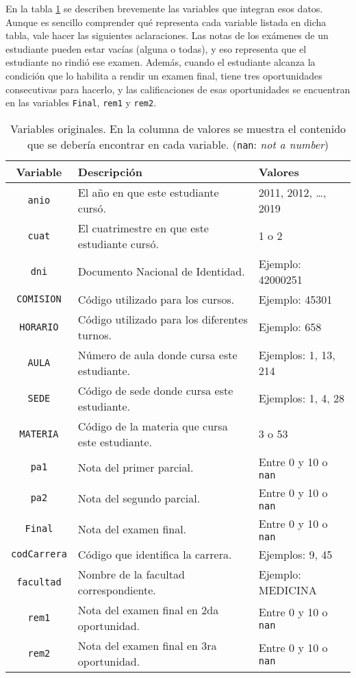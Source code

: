 \documentclass[a4paper,11pt,dvipsnames]{article}
\begin{document}
En la tabla \ref{tab:originales} se describen brevemente las variables que integran esos datos. Aunque es sencillo comprender qué representa cada variable listada en dicha tabla, vale hacer las siguientes aclaraciones. Las notas de los exámenes de un estudiante pueden estar vacías (alguna o todas), y eso representa que el estudiante no rindió ese examen. Además, cuando el estudiante alcanza la condición que lo habilita a rendir un examen final, tiene tres oportunidades consecutivas para hacerlo, y las calificaciones de esas oportunidades se encuentran en las variables \texttt{Final}, \texttt{rem1} y \texttt{rem2}.\par\medskip

\begin{table}[!h]
    \caption{Variables originales. En la columna de valores se muestra el contenido que se debería encontrar en cada variable. (\texttt{nan}: \textit{not a number})}
    \begin{center}
    \begin{tabular}{cll}
    \hline
    \textbf{Variable} & \textbf{Descripción} & \textbf{Valores}\\
    \hline
    \texttt{anio} & El año en que este estudiante cursó. & 2011, 2012, \dots, 2019\\
    \texttt{cuat} & El cuatrimestre en que este estudiante cursó. & 1 o 2\\
    \texttt{dni} & Documento Nacional de Identidad. & Ejemplo: 42000251\\
    \texttt{COMISION} & Código utilizado para los cursos. & Ejemplo: 45301\\
    \texttt{HORARIO} & Código utilizado para los diferentes turnos. & Ejemplo: 658\\
    \texttt{AULA} & Número de aula donde cursa este estudiante. & Ejemplos: 1, 13, 214\\
    \texttt{SEDE} & Código de sede donde cursa este estudiante. & Ejemplos: 1, 4, 28\\
    \texttt{MATERIA} & Código de la materia que cursa este estudiante. & 3 o 53\\
    \texttt{pa1} & Nota del primer parcial. & Entre 0 y 10 o \texttt{nan}\\
    \texttt{pa2} & Nota del segundo parcial. & Entre 0 y 10 o \texttt{nan}\\
    \texttt{Final} & Nota del examen final. & Entre 0 y 10 o \texttt{nan}\\
    \texttt{codCarrera} & Código que identifica la carrera. & Ejemplos: 9, 45\\
    \texttt{facultad} & Nombre de la facultad correspondiente. & Ejemplo: MEDICINA\\
    \texttt{rem1} & Nota del examen final en 2da oportunidad. & Entre 0 y 10 o \texttt{nan}\\
    \texttt{rem2} & Nota del examen final en 3ra oportunidad. & Entre 0 y 10 o \texttt{nan}\\
    \hline
    \end{tabular}
    \label{tab:originales}
    \end{center}
\end{table}
\end{document}
